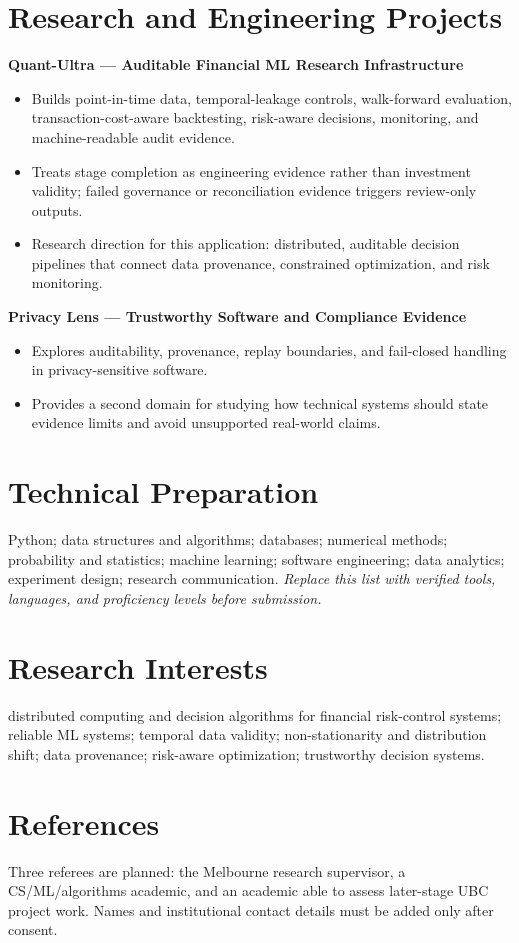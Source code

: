 \documentclass[11pt]{article}
\begin{document}
\section*{Research and Engineering Projects}
\textbf{Quant-Ultra --- Auditable Financial ML Research Infrastructure}
\begin{itemize}
\item Builds point-in-time data, temporal-leakage controls, walk-forward evaluation, transaction-cost-aware backtesting, risk-aware decisions, monitoring, and machine-readable audit evidence.
\item Treats stage completion as engineering evidence rather than investment validity; failed governance or reconciliation evidence triggers review-only outputs.
\item Research direction for this application: distributed, auditable decision pipelines that connect data provenance, constrained optimization, and risk monitoring.
\end{itemize}

\begin{samepage}
\textbf{Privacy Lens --- Trustworthy Software and Compliance Evidence}
\begin{itemize}
\item Explores auditability, provenance, replay boundaries, and fail-closed handling in privacy-sensitive software.
\item Provides a second domain for studying how technical systems should state evidence limits and avoid unsupported real-world claims.
\end{itemize}
\end{samepage}

\section*{Technical Preparation}
Python; data structures and algorithms; databases; numerical methods; probability and statistics; machine learning; software engineering; data analytics; experiment design; research communication. \textit{Replace this list with verified tools, languages, and proficiency levels before submission.}

\section*{Research Interests}
distributed computing and decision algorithms for financial risk-control systems; reliable ML systems; temporal data validity; non-stationarity and distribution shift; data provenance; risk-aware optimization; trustworthy decision systems.

\section*{References}
Three referees are planned: the Melbourne research supervisor, a CS/ML/algorithms academic, and an academic able to assess later-stage UBC project work. Names and institutional contact details must be added only after consent.
\end{document}
